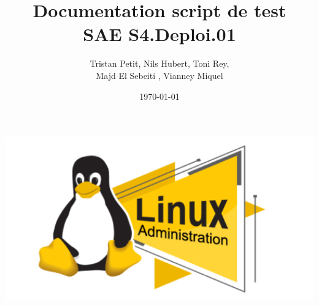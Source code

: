 \documentclass{article}
\begin{document}
\title{Documentation script de test \\ SAE S4.Deploi.01}
\author{Tristan Petit, Nils Hubert, Toni Rey,\\ 
 Majd El Sebeiti , Vianney Miquel}
\date{\today}
\maketitle
\begin{center}
    \centering
    \vspace{1cm} %
    \includegraphics[width=1\textwidth]{Images/Logo-script-test.png} %
\end{center}

\maketitle

\newpage
\renewcommand{\contentsname}{Table des matières}

\tableofcontents

\newpage
{}











\end{document}
